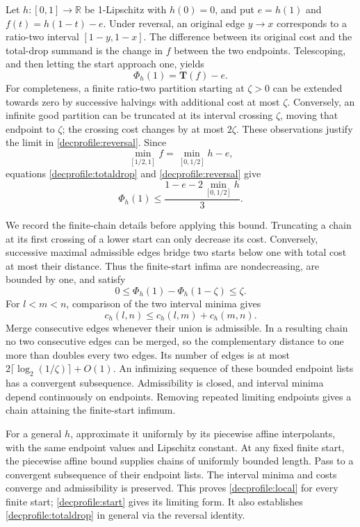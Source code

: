 Let \(h:[0,1]\to\mathbb R\) be 1-Lipschitz with \(h(0)=0\),
and put \(e=h(1)\) and \(f(t)=h(1-t)-e\).
Under reversal, an original edge \(y\to x\) corresponds to a ratio-two
interval \([1-y,1-x]\). The difference between its original cost and
the total-drop summand is the change in \(f\) between the two endpoints.
Telescoping, and then letting the start approach one, yields
\begin{equation}\label{decprofile:reversal}
 \Phi_h(1)=\mathbf T(f)-e.
\end{equation}
For completeness, a finite ratio-two partition starting at \(\zeta>0\)
can be extended towards zero by successive halvings with additional cost
at most \(\zeta\). Conversely, an infinite good partition can be truncated
at its interval crossing \(\zeta\), moving that endpoint to \(\zeta\);
the crossing cost changes by at most \(2\zeta\). These observations
justify the limit in \eqref{decprofile:reversal}.
Since
\[
 \min_{[1/2,1]}f=\min_{[0,1/2]}h-e,
\]
equations \eqref{decprofile:totaldrop} and \eqref{decprofile:reversal}
give
\begin{equation}\label{decprofile:local}
 \Phi_h(1)\le\frac{1-e-2\min_{[0,1/2]}h}{3}.
\end{equation}

We record the finite-chain details before applying this bound.
Truncating a chain at its first crossing of a lower start can only
decrease its cost. Conversely, successive maximal admissible edges bridge
two starts below one with total cost at most their distance. Thus the
finite-start infima are nondecreasing, are bounded by one, and satisfy
\begin{equation}\label{decprofile:start}
 0\le\Phi_h(1)-\Phi_h(1-\zeta)\le\zeta.
\end{equation}
For \(l<m<n\), comparison of the two interval minima gives
\begin{equation}\label{decprofile:merge}
 c_h(l,n)\le c_h(l,m)+c_h(m,n).
\end{equation}
Merge consecutive edges whenever their union is admissible.
In a resulting chain no two consecutive edges can be merged, so the
complementary distance to one more than doubles every two edges.
Its number of edges is at most
\(2\lceil\log_2(1/\zeta)\rceil+O(1)\).
An infimizing sequence of these bounded endpoint lists has a convergent
subsequence. Admissibility is closed, and interval minima depend
continuously on endpoints. Removing repeated limiting endpoints gives
a chain attaining the finite-start infimum.

For a general \(h\), approximate it uniformly by its piecewise affine
interpolants, with the same endpoint values and Lipschitz constant.
At any fixed finite start, the piecewise affine bound supplies chains
of uniformly bounded length. Pass to a convergent subsequence of their
endpoint lists. The interval minima and costs converge and admissibility
is preserved. This proves \eqref{decprofile:local} for every finite start;
\eqref{decprofile:start} gives its limiting form. It also establishes
\eqref{decprofile:totaldrop} in general via the reversal identity.

